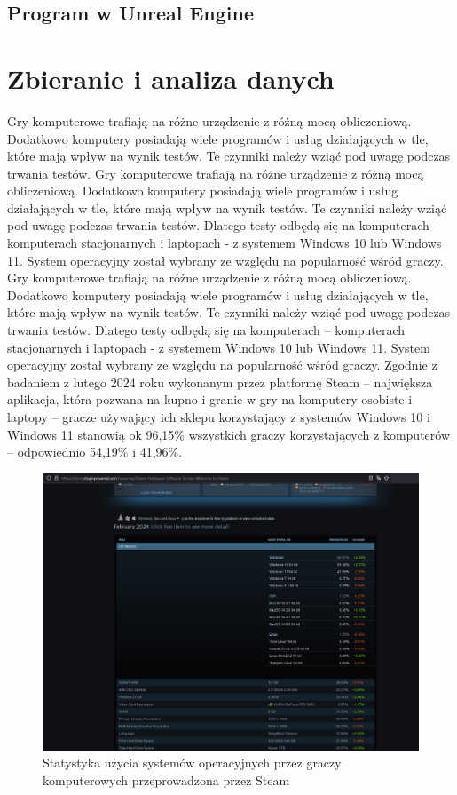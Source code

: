 \documentclass[12pt,twoside]{article}
\begin{document}
\subsection{Program w Unreal Engine}

\clearpage
\section{Zbieranie i analiza danych}
Gry komputerowe trafiają na różne urządzenie z różną mocą obliczeniową.
Dodatkowo komputery posiadają wiele programów i usług działających w tle, które
mają wpływ na wynik testów. Te czynniki należy wziąć pod uwagę podczas trwania
testów. Gry komputerowe trafiają na różne urządzenie z różną mocą obliczeniową.
Dodatkowo komputery posiadają wiele programów i usług działających w tle, które
mają wpływ na wynik testów. Te czynniki należy wziąć pod uwagę podczas trwania
testów. Dlatego testy odbędą się na komputerach – komputerach stacjonarnych i
laptopach - z systemem Windows 10 lub Windows 11. System operacyjny został
wybrany ze względu na popularność wśród graczy. Gry komputerowe trafiają na
różne urządzenie z różną mocą obliczeniową. Dodatkowo komputery posiadają wiele
programów i usług działających w tle, które mają wpływ na wynik testów. Te
czynniki należy wziąć pod uwagę podczas trwania testów. Dlatego testy odbędą się
na komputerach – komputerach stacjonarnych i laptopach - z systemem Windows 10
lub Windows 11. System operacyjny został wybrany ze względu na popularność wśród
graczy. Zgodnie z badaniem z lutego 2024 roku wykonanym przez platformę Steam –
największa aplikacja, która pozwana na kupno i granie w gry na komputery
osobiste i laptopy – gracze używający ich sklepu korzystający z systemów Windows
10 i Windows 11 stanowią ok
96,15\% wszystkich graczy korzystających z komputerów – odpowiednio 54,19\% i 41,96\%. 

\begin{figure}[ht]
    \centering
    \includegraphics[width=14cm]{figures/SteamHardwareSoftwareSurvay.png}
    \caption{Statystyka użycia systemów operacyjnych przez graczy komputerowych przeprowadzona przez Steam \cite{SteamSurvey}}
    \label{SteamHardwareSoftwareSurvay}
\end{figure}
\end{document}
